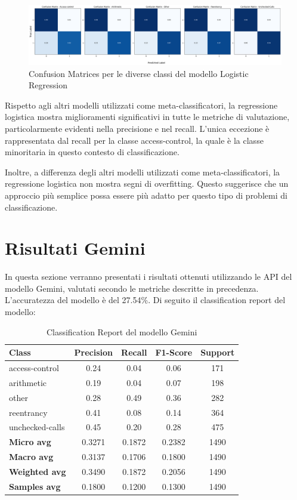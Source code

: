 \documentclass[../../Thesis.tex]{subfiles}
\begin{document}
\begin{figure}[H]
    \includegraphics[width=1.05\textwidth]{../../img/CF-LR.png}
    \caption{Confusion Matrices per le diverse classi del modello Logistic Regression}
\end{figure}

Rispetto agli altri modelli utilizzati come meta-classificatori, la regressione logistica mostra miglioramenti significativi in tutte le metriche di valutazione, particolarmente evidenti nella precisione e nel recall. L'unica eccezione è rappresentata dal recall per la classe access-control, la quale è la classe minoritaria in questo contesto di classificazione.

Inoltre, a differenza degli altri modelli utilizzati come meta-classificatori, la regressione logistica non mostra segni di overfitting. Questo suggerisce che un approccio più semplice possa essere più adatto per questo tipo di problemi di classificazione.



\section{Risultati Gemini}

In questa sezione verranno presentati i risultati ottenuti utilizzando le API del modello Gemini, valutati secondo le metriche descritte in precedenza.\\
L'accuratezza del modello è del 27.54\%. Di seguito il classification report del modello:


\begin{table}[H]
    \centering
    \small
    \begin{tabular}{lcccc}
    \hline
    \textbf{Class} & \textbf{Precision} & \textbf{Recall} & \textbf{F1-Score} & \textbf{Support} \\
    \hline
    access-control & 0.24 & 0.04 & 0.06 & 171 \\
    arithmetic & 0.19 & 0.04 & 0.07 & 198 \\
    other & 0.28 & 0.49 & 0.36 & 282 \\
    reentrancy & 0.41 & 0.08 & 0.14 & 364 \\
    unchecked-calls & 0.45 & 0.20 & 0.28 & 475 \\
    \hline
    \textbf{Micro avg} & 0.3271 & 0.1872 & 0.2382 & 1490 \\
    \textbf{Macro avg} & 0.3137 & 0.1706 & 0.1800 & 1490 \\
    \textbf{Weighted avg} & 0.3490 & 0.1872 & 0.2056 & 1490 \\
    \textbf{Samples avg} & 0.1800 & 0.1200 & 0.1300 & 1490 \\
    \hline
\end{tabular}
\caption{Classification Report del modello Gemini}
\end{table}
\end{document}
